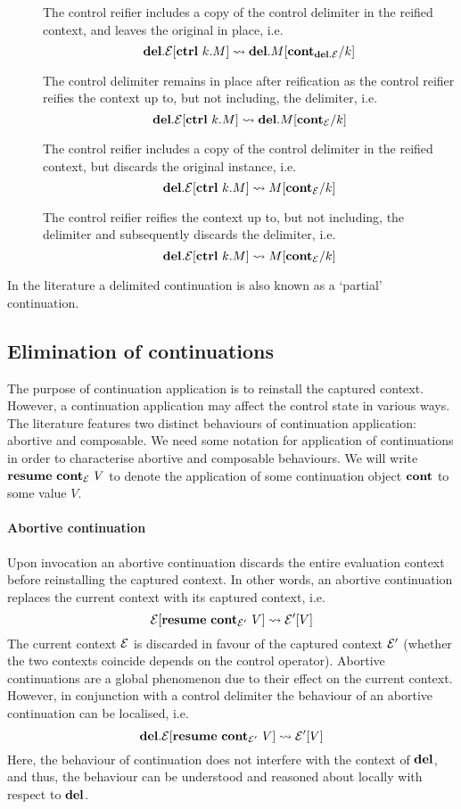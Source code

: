 \documentclass[12pt,phd,lfcs,twoside,openright,logo,leftchapter,normalheadings]{infthesis}
\theoremstyle{plain}
\theoremstyle{definition}
\begin{document}
\begin{description}
\item[\CCpp] The control reifier includes a copy of the control delimiter in the
  reified context, and leaves the original in place, i.e.
\[
  \mathbf{del}.\mathcal{E}[\mathbf{ctrl}~k.M] \leadsto \mathbf{del}.M[\mathbf{cont}_{\mathbf{del}.\mathcal{E}}/k]
\]
\item[\CCpm] The control delimiter remains in place after
  reification as the control reifier reifies the context up to, but
  not including, the delimiter, i.e.
  \[
    \mathbf{del}.\mathcal{E}[\mathbf{ctrl}~k.M] \leadsto \mathbf{del}.M[\mathbf{cont}_{\mathcal{E}}/k]
  \]
\item[\CCmp] The control reifier includes a copy of the control
  delimiter in the reified context, but discards the original
  instance, i.e.
  \[
    \mathbf{del}.\mathcal{E}[\mathbf{ctrl}~k.M] \leadsto M[\mathbf{cont}_{\mathcal{E}}/k]
  \]
\item[\CCmm] The control reifier reifies the context up to, but not
  including, the delimiter and subsequently discards the delimiter, i.e.
  \[
    \mathbf{del}.\mathcal{E}[\mathbf{ctrl}~k.M] \leadsto M[\mathbf{cont}_{\mathcal{E}}/k]
  \]
\end{description}




%
In the literature a delimited continuation is also known as a
`partial' continuation.

\subsection{Elimination of continuations}

The purpose of continuation application is to reinstall the captured
context.
%
However, a continuation application may affect the control state in
various ways. The literature features two distinct behaviours of
continuation application: abortive and composable. We need some
notation for application of continuations in order to characterise
abortive and composable behaviours. We will write
$\mathbf{resume}~\mathbf{cont}_{\mathcal{E}}~V$ to denote the application of some
continuation object $\mathbf{cont}$ to some value $V$.

\paragraph{Abortive continuation} Upon invocation an abortive
continuation discards the entire evaluation context before
reinstalling the captured context. In other words, an abortive
continuation replaces the current context with its captured context,
i.e.
%
\[
  \mathcal{E}[\mathbf{resume}~\mathbf{cont}_{\mathcal{E}'}~V] \leadsto \mathcal{E}'[V]
\]
%
The current context $\mathcal{E}$ is discarded in favour of the captured
context $\mathcal{E}'$ (whether the two contexts coincide depends on the
control operator).  Abortive continuations are a global phenomenon due
to their effect on the current context. However, in conjunction with a
control delimiter the behaviour of an abortive continuation can be
localised, i.e.
%
\[
  \mathbf{del}.\mathcal{E}[\mathbf{resume}~\mathbf{cont}_{\mathcal{E}'}~V] \leadsto \mathcal{E}'[V]
\]
%
Here, the behaviour of continuation does not interfere with the
context of $\mathbf{del}$, and thus, the behaviour can be understood and
reasoned about locally with respect to $\mathbf{del}$.
\end{document}
